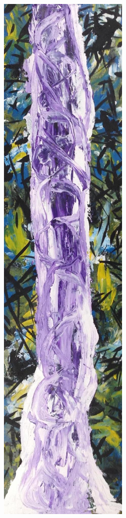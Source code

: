 \documentclass[11pt]{article}
\begin{document}
\begin{itemize}
\begin{itemize}
\begin{itemize}
\includegraphics[width=.9\linewidth]{./app/assets/images/rudasill_1.jpeg}


\end{itemize}
\end{itemize}
\end{itemize}
\end{document}
